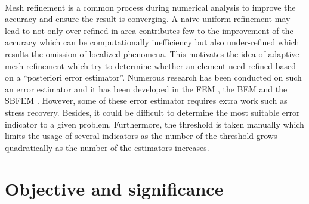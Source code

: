 \paragraph{}
Mesh refinement is a common process during numerical analysis to improve the accuracy and ensure the result is converging.
A naive uniform refinement may lead to not only over-refined in area contributes few to the improvement of the accuracy which can be computationally inefficiency but also under-refined which results the omission of localized phenomena.
This motivates the idea of adaptive mesh refinement which try to determine whether an element need refined based on a ``posteriori error estimator''.
Numerous research has been conducted on such an error estimator and it has been developed in the FEM \citep{Duval2018, doi:10.1002/gamm.201490020,PRUDHOMME20091887}, the BEM \citep{Zhao1998, Guiggiani1990, KAMIYA1992223} and the SBFEM \citep{NME:NME439}.
However, some of these error estimator requires extra work such as stress recovery.
Besides, it could be difficult to determine the most suitable error indicator to a given problem.
Furthermore, the threshold is taken manually which limits the usage of several indicators as the number of the threshold grows quadratically as the number of the estimators increases.



\section{Objective and significance}
